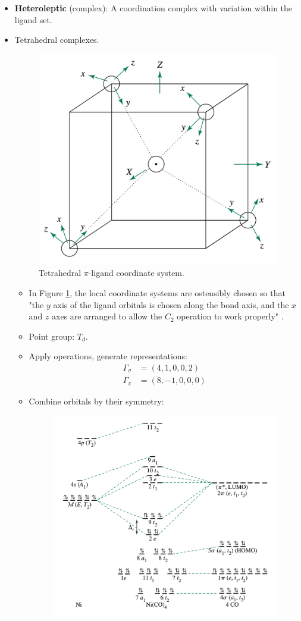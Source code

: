\documentclass[../notes.tex]{subfiles}
\begin{document}
\begin{itemize}
    \item \textbf{Heteroleptic} (complex): A coordination complex with variation within the ligand set.
    \item Tetrahedral complexes.
    \begin{figure}[h!]
        \centering
        \includegraphics[width=0.32\linewidth]{../ExtFiles/piTetrahedralLigand.png}
        \caption{Tetrahedral $\pi$-ligand coordinate system.}
        \label{fig:piTetrahedralLigand}
    \end{figure}
    \begin{itemize}
        \item In Figure \ref{fig:piTetrahedralLigand}, the local coordinate systems are ostensibly chosen so that "the $y$ axis of the ligand orbitals is chosen along the bond axis, and the $x$ and $z$ axes are arranged to allow the $C_2$ operation to work properly" \parencite[381]{bib:MiesslerFischerTarr}.
        \item Point group: $T_d$.
        \item Apply operations, generate representations:
        \begin{align*}
            \Gamma_\sigma &= (4,1,0,0,2)\\
            \Gamma_\pi &= (8,-1,0,0,0)
        \end{align*}
        \item Combine orbitals by their symmetry:
        \begin{figure}[H]
            \centering
            \includegraphics[width=0.6\linewidth]{../ExtFiles/orbitalDiagram-MH4-tetrahedral.png}

\end{figure}
\end{itemize}
\end{itemize}
\end{document}
